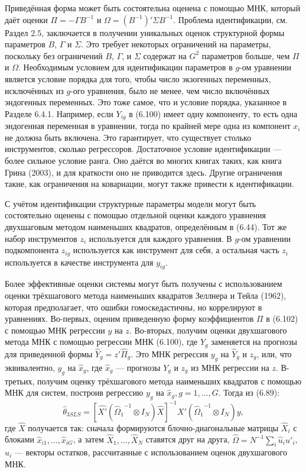 Приведённая форма может быть состоятельна оценена с помощью МНК, который даёт оценки $\Pi=-\Gamma B^{-1}$ и $\Omega=(B^{-1})' \Sigma B^{-1}$. Проблема идентификации, см. Раздел 2.5, заключается в получении уникальных оценок структурной формы параметров $B$, $\Gamma$ и $\Sigma$. Это требует некоторых ограничений на параметры, поскольку без ограничений $B$, $\Gamma$, и $\Sigma$ содержат на $G^2$ параметров больше, чем $\Pi$ и $\Omega$. Необходимым условием для идентификации параметров в $g$-ом уравнении является условие порядка для того, чтобы число экзогенных переменных, исключённых из $g$-ого уравнения, было не менее, чем число включённых эндогенных переменных. Это тоже самое, что и условие порядка, указанное в Разделе 6.4.1. Например, если $Y_{ig}$ в (6.100) имеет одну компоненту, то есть одна эндогенная переменная в уравнении, тогда по крайней мере одна из компонент $x_i$ не должна быть включена. Это гарантирует, что существует столько инструментов, сколько регрессоров.
Достаточное условие идентификации --- более сильное условие ранга. Оно даётся во многих книгах таких, как книга Грина (2003), и для краткости оно не приводится здесь. Другие ограничения такие, как ограничения на ковариации, могут также привести к идентификации.

С учётом идентификации структурные параметры модели могут быть состоятельно оценены с помощью отдельной оценки каждого уравнения двухшаговым методом наименьших квадратов, определённым в (6.44). Тот же набор инструментов $z_i$ используется для каждого уравнения. В $g$-ом уравнении подкомпонента $z_{ig}$ используется как инструмент для себя, а остальная часть $z_i$ используется в качестве инструмента для $y_{ig}$.

Более эффективные оценки системы могут быть получены с использованием оценки трёхшагового метода наименьших квадратов Зеллнера и Тейла (1962), которая предполагает, что ошибки гомоскедастичны, но коррелируют в уравнениях. Во-первых, оценим приведенную форму коэффициентов $\Pi$ в (6.102) с помощью МНК регрессии $y$ на $z$. Во-вторых, получим оценки двухшагового метода МНК с помощью регрессии МНК (6.100), где $Y_g$ заменяется на прогнозы для приведенной формы $\hat{Y}_g=z' \hat{\Pi}_g$. Это МНК регрессия $y_g$ на $\hat{Y}_g$ и $z_g$, или, что эквивалентно, $y_g$ на $\hat{x}_g$, где $\hat{x}_g$ --- прогнозы $Y_g$ и $z_g$ из МНК регрессии на $z$. В-третьих, получим оценку трёхшагового метода наименьших квадратов с помощью МНК для систем, построив регрессию  $y_g$ на $\hat{x}_g, g=1, \dots, G$. Тогда из (6.89):
\[
\hat{\theta}_{3SLS} = \left[ \hat{X'} \left( {\hat{\Omega}_1}^{-1} \otimes I_N \right) \hat{X} \right]^{-1} \hat{X'} \left( {\hat{\Omega}_1}^{-1} \otimes I_N \right)y,
\]
где $\hat{X}$ получается так: сначала формируются блочно-диагональные матрицы $\hat{X}_i$ с  блоками $\hat{x}_{i1}, \dots, \hat{x}_{iG}$, а затем $\hat{X}_1, \dots, \hat{X}_N$ ставятся друг на друга, $\hat{\Omega}=N^{-1} \sum_i \hat{u}_i \hat{u}'_i$, $\hat{u}_i$ --- векторы остатков, рассчитанные с использованием оценок двухшагового МНК.

